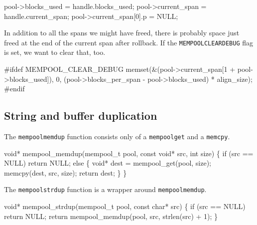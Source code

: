 \nwenddocs{}\endmoddef
pool->blocks_used  = handle.blocks_used;
pool->current_span = handle.current_span;
pool->current_span[0].p = NULL;
\nwendcode{}\nwdocspar

In addition to all the spans we might have freed,
there is probably space just freed at the end of the current
span after rollback.  If the {\tt{}MEMPOOL{}CLEAR{}DEBUG} flag is
set, we want to clear that, too.

\nwenddocs{}\endmoddef
#ifdef MEMPOOL_CLEAR_DEBUG
memset(&(pool->current_span[1 + pool->blocks_used]), 0,
       (pool->blocks_per_span - pool->blocks_used) * align_size);
#endif
\nwendcode{}\nwdocspar


\subsection{String and buffer duplication}

The {\tt{}mempool{}memdup} function consists only of a {\tt{}mempool{}get}
and a {\tt{}memcpy}.

\nwenddocs{}\plusendmoddef
void* mempool_memdup(mempool_t pool, const void* src, int size)
\{
    if (src == NULL)
        return NULL;
    else \{
        void* dest = mempool_get(pool, size);
        memcpy(dest, src, size);
        return dest;
    \}
\}

\nwendcode{}\nwdocspar

The {\tt{}mempool{}strdup} function is a wrapper around {\tt{}mempool{}memdup}.

\nwenddocs{}\plusendmoddef
void* mempool_strdup(mempool_t pool, const char* src)
\{
    if (src == NULL)
        return NULL;
    return mempool_memdup(pool, src, strlen(src) + 1);
\}

